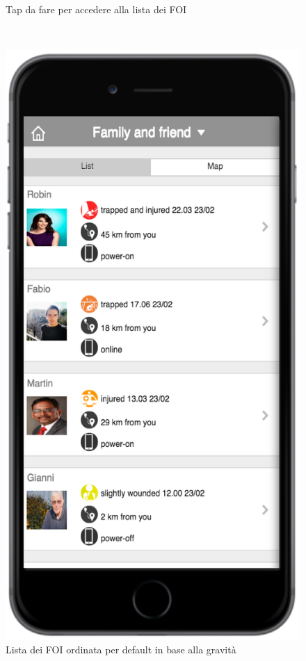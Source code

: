 \begin{figure}
\begin{minipage}[b]{6cm}
	\caption{Tap da fare per accedere alla lista dei FOI }
	\label{fig:tapfoi}
 \end{minipage}
 \ \hspace{6 mm} \hspace{7 mm} \
 \begin{minipage}[b]{6cm}
\centering
	\includegraphics[scale=0.6]{interfaccia/listafoi.png}
	\caption{Lista dei FOI ordinata per default in base alla gravità }
	\label{fig:lista-foi}
 \end{minipage}
\end{figure}



